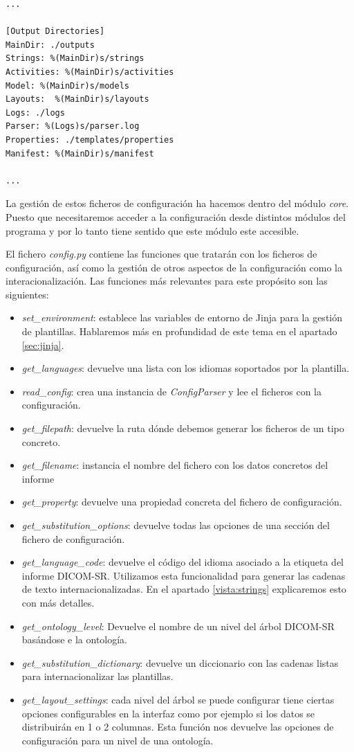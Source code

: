 \begin{lstlisting}[label=settingsINI,caption=Sección del fichero de configuración]
...

[Output Directories]
MainDir: ./outputs
Strings: %(MainDir)s/strings
Activities: %(MainDir)s/activities
Model: %(MainDir)s/models
Layouts:  %(MainDir)s/layouts
Logs: ./logs
Parser: %(Logs)s/parser.log
Properties: ./templates/properties
Manifest: %(MainDir)s/manifest

...
\end{lstlisting}

La gestión de estos ficheros de configuración ha hacemos dentro del módulo \emph{core}. Puesto que necesitaremos acceder a la configuración desde distintos módulos del programa y por lo tanto tiene sentido que este módulo este accesible.\par
El fichero \emph{config.py} contiene las funciones que tratarán con los ficheros de configuración, así como la gestión de otros aspectos de la configuración como la interacionalización. Las funciones más relevantes para este propósito son las siguientes:
\begin{itemize}
\item \emph{set\_environment}: establece las variables de entorno de Jinja para la gestión de plantillas. Hablaremos más en profundidad de este tema en el apartado \ref{sec:jinja}.
\item \emph{get\_languages}: devuelve una lista con los idiomas soportados por la plantilla.
\item \emph{read\_config}: crea una instancia de \emph{ConfigParser} y lee el ficheros con la configuración.
\item \emph{get\_filepath}: devuelve la ruta dónde debemos generar los ficheros de un tipo concreto.
\item \emph{get\_filename}: instancia el nombre del fichero con los datos concretos del informe
\item \emph{get\_property}: devuelve una propiedad concreta del fichero de configuración. 
\item \emph{get\_substitution\_options}: devuelve todas las opciones de una sección del fichero de configuración.
\item \emph{get\_language\_code}: devuelve el código del idioma asociado a la etiqueta del informe DICOM-SR. Utilizamos esta funcionalidad para generar las cadenas de texto internacionalizadas. En el apartado \ref{vista:strings} explicaremos esto con más detalles.
\item \emph{get\_ontology\_level}: Devuelve el nombre de un nivel del árbol DICOM-SR basándose e la ontología.
\item \emph{get\_substitution\_dictionary}: devuelve un diccionario con las cadenas listas para internacionalizar las plantillas. 
\item \emph{get\_layout\_settings}: cada nivel del árbol se puede configurar tiene ciertas opciones configurables en la interfaz como por ejemplo si los datos se distribuirán en 1 o 2 columnas. Esta función nos devuelve las opciones de configuración para un nivel de una ontología.
\end{itemize}
